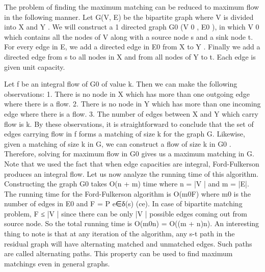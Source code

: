 \begin{definition}

The problem of finding the maximum matching can be reduced to maximum flow in the following
manner. Let G(V, E) be the bipartite graph where V is divided into X and Y . We will construct a
1
directed graph G0
(V
0
, E0
), in which V
0 which contains all the nodes of V along with a source node
s and a sink node t. For every edge in E, we add a directed edge in E0
from X to Y . Finally we
add a directed edge from s to all nodes in X and from all nodes of Y to t. Each edge is given unit
capacity.

Let f be an integral flow of G0 of value k. Then we can make the following observations:
1. There is no node in X which has more than one outgoing edge where there is a flow.
2. There is no node in Y which has more than one incoming edge where there is a flow.
3. The number of edges between X and Y which carry flow is k.
By these observations, it is straightforward to conclude that the set of edges carrying flow in f
forms a matching of size k for the graph G. Likewise, given a matching of size k in G, we can
construct a flow of size k in G0
. Therefore, solving for maximum flow in G0 gives us a maximum
matching in G. Note that we used the fact that when edge capacities are integral, Ford-Fulkerson
produces an integral flow.
Let us now analyze the running time of this algorithm. Constructing the graph G0
takes O(n + m)
time where n = |V | and m = |E|. The running time for the Ford-Fulkerson algorithm is O(m0F)
where m0
is the number of edges in E0 and F =
P
e∈δ(s)
(ce). In case of bipartite matching problem,
F ≤ |V | since there can be only |V | possible edges coming out from source node. So the total
running time is O(m0n) = O((m + n)n).
An interesting thing to note is that at any iteration of the algorithm, any s-t path in the residual
graph will have alternating matched and unmatched edges. Such paths are called alternating
paths. This property can be used to find maximum matchings even in general graphs.

\end{definition}

